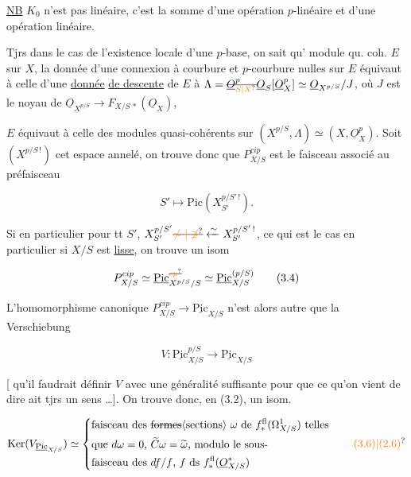 \uline{NB} $K_0$  n'est pas linéaire, c'est la somme d'une opération $p$-linéaire et d'une opération linéaire.

Tjrs dans le cas de l'existence locale d'une $p$-base, on sait qu' module  qu. coh. $E$ sur $X$, la donnée d'une connexion à courbure et $p$-courbure nulles  sur $E$ équivaut à celle d'une \uline{donnée} \uline{de descente} de $E$ à $\Lambda=\deleted{\underline O_{\unsure{S|X}}^p}\underline O_S[\underline O_X^p]\simeq\underline O_{X^{p/S}}/J$, où $J$ est le noyau de $\underline O_{X^{p/S}}\longrightarrow F_{X/S\,*}(\underline O_X)$,

  $E$ équivaut à celle des modules quasi-cohérents sur $(X^{p/S},\Lambda)\simeq(X,\underline O_X^p)$. Soit $(X^{p/S\,!})$ cet espace annelé, on trouve donc que $P^{cip}_{X/S}$ est le faisceau associé au préfaisceau

\[
S'\longmapsto\mathrm{Pic}(X_{S'}^{p/S'\,!}).
\]


Si en particulier pour tt $S'$, $X_{S'}^{p/S'}\deleted{\unsure{\not\sim|\not\ni}}\xleftarrow{\sim} X_{S'}^{p/S'\,!}$, ce qui est le cas en particulier si $X/S$ est \uline{lisse}, on trouve un isom

\[
P^{cip}_{X/S}\simeq \underline{\mathrm{Pic}}^{\deleted{\unsure{cp}}}_{X^{p/S}/S}\simeq\underline{\mathrm{Pic}}_{X/S}^{(p/S)}\tag*{(3.4)}
\]

L'homomorphisme canonique $P^{cip}_{X/S}\to\underline{\mathrm{Pic}}_{X/S}$ n'est alors autre que la Verschiebung

\[
V\colon\underline{\mathrm{Pic}}_{X/S}^{p/S}\longrightarrow\underline{\mathrm{Pic}}_{X/S}\tag*{(3.5)}
\]

[ qu'il faudrait définir $V$ avec une généralité suffisante pour que ce qu'on vient de dire ait tjrs un sens \ldots]. On trouve donc, en   (3.2), un isom.

\[
\mathrm{Ker}(V_{\underline{\mathrm{Pic}}_{X/S}})\simeq
\left\{\begin{aligned}
&\text{faisceau des \deleted{formes}\inserted{sections} $\omega$ de $f_*^{\mathrm{fl}}(\Omega^1_{X/S})$ telles}\\
&\text{que $d\omega=0$, $\widetilde C\omega=\widetilde\omega$, modulo le sous-}\\
&\text{faisceau des $df/f$, $f$ ds $f_*^{\mathrm{fl}}(\underline O^*_{X/S})$}
\end{aligned}\right.\tag*{\unsure{(3.6)|(2.6)}}
\]

